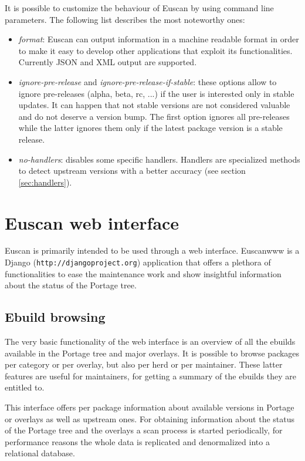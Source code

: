 It is possible to customize the behaviour of Euscan by using command line parameters. The following list describes the most noteworthy ones:
\begin{itemize}
\item \emph{format}: Euscan can output information in a machine readable format in order to make it easy to develop other applications that exploit its functionalities. Currently JSON and XML output are supported.
\item \emph{ignore-pre-release} and \emph{ignore-pre-release-if-stable}: these options allow to ignore pre-releases (alpha, beta, rc, ...) if the user is interested only in stable updates. It can happen that not stable versions are not considered valuable and do not deserve a version bump. The first option ignores all pre-releases while the latter ignores them only if the latest package version is a stable release.
\item \emph{no-handlers}: disables some specific handlers. Handlers are specialized methods to detect upstream versions with a better accuracy (see section \ref{sec:handlers}). 
\end{itemize}


\section{Euscan web interface}
Euscan is primarily intended to be used through a web interface. Euscanwww is a Django (\texttt{http://djangoproject.org}) application that offers a plethora of functionalities to ease the maintenance work and show insightful information about the status of the Portage tree.

\subsection{Ebuild browsing}
The very basic functionality of the web interface is an overview of all the ebuilds available in the Portage tree and major overlays. It is possible to browse packages per category or per overlay, but also per herd or per maintainer. These latter features are useful for maintainers, for getting a summary of the ebuilds they are entitled to.

This interface offers per package information about available versions in Portage or overlays as well as upstream ones.
For obtaining information about the status of the Portage tree and the overlays a scan process is started periodically, for performance reasons the whole data is replicated and denormalized into a relational database.

